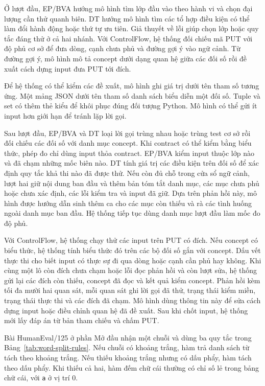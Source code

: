 Ở lượt đầu, EP/BVA hướng mô hình tìm lớp đầu vào theo hành vi và chọn đại lượng cần thử quanh biên. DT hướng mô hình tìm các tổ hợp điều kiện có thể làm đổi hành động hoặc thứ tự ưu tiên. Giả thuyết về lỗi giúp chọn lớp hoặc quy tắc đáng thử ở cả hai nhánh. Với ControlFlow, hệ thống đối chiếu mã PUT với độ phủ cơ sở để đưa dòng, cạnh chưa phủ và đường gợi ý vào ngữ cảnh. Từ đường gợi ý, mô hình mô tả concept dưới dạng quan hệ giữa các đối số rồi đề xuất cách dựng input đưa PUT tới đích.

Để hệ thống có thể kiểm các đề xuất, mô hình ghi giá trị dưới tên tham số tương ứng. Một mảng JSON dưới tên tham số danh sách biểu diễn một đối số. Tuple và set có thêm thẻ kiểu để khôi phục đúng đối tượng Python. Mô hình có thể gửi ít input hơn giới hạn để tránh lặp lời gọi.

Sau lượt đầu, EP/BVA và DT loại lời gọi trùng nhau hoặc trùng test cơ sở rồi đối chiếu các đối số với danh mục concept. Khi contract có thể kiểm bằng biểu thức, phép đo chỉ dùng input thỏa contract. EP/BVA kiểm input thuộc lớp nào và đã chạm những mốc biên nào. DT tính giá trị các điều kiện trên đối số để xác định quy tắc khả thi nào đã được thử. Nếu còn đủ chỗ trong cửa sổ ngữ cảnh, lượt hai giữ nội dung ban đầu và thêm bản tóm tắt danh mục, các mục chưa phủ hoặc chưa xác định, các lỗi kiểm tra và input đã giữ. Dựa trên phản hồi này, mô hình được hướng dẫn sinh thêm ca cho các mục còn thiếu và rà các tình huống ngoài danh mục ban đầu. Hệ thống tiếp tục dùng danh mục lượt đầu làm mốc đo độ phủ.

Với ControlFlow, hệ thống chạy thử các input trên PUT có đích. Nếu concept có biểu thức, hệ thống tính biểu thức đó trên các bộ đối số gắn với concept. Dấu vết thực thi cho biết input có thực sự đi qua dòng hoặc cạnh cần phủ hay không. Khi cùng một lô còn đích chưa chạm hoặc lỗi đọc phản hồi và còn lượt sửa, hệ thống gửi lại các đích còn thiếu, concept đã đọc và kết quả kiểm concept. Phản hồi kèm tối đa mười hai quan sát, mỗi quan sát ghi lời gọi đã thử, trạng thái kiểm miền, trạng thái thực thi và các đích đã chạm. Mô hình dùng thông tin này để sửa cách dựng input hoặc điều chỉnh quan hệ đã đề xuất. Sau khi chốt input, hệ thống mới lấy đáp án từ bản tham chiếu và chấm PUT.

Bài HumanEval/125 ở phần Mở đầu nhận một chuỗi và dùng ba quy tắc trong Bảng~\ref{tab:word-split-rules}. Nếu chuỗi có khoảng trắng, hàm trả danh sách từ tách theo khoảng trắng. Nếu thiếu khoảng trắng nhưng có dấu phẩy, hàm tách theo dấu phẩy. Khi thiếu cả hai, hàm đếm chữ cái thường có chỉ số lẻ trong bảng chữ cái, với \texttt{a} ở vị trí 0.

